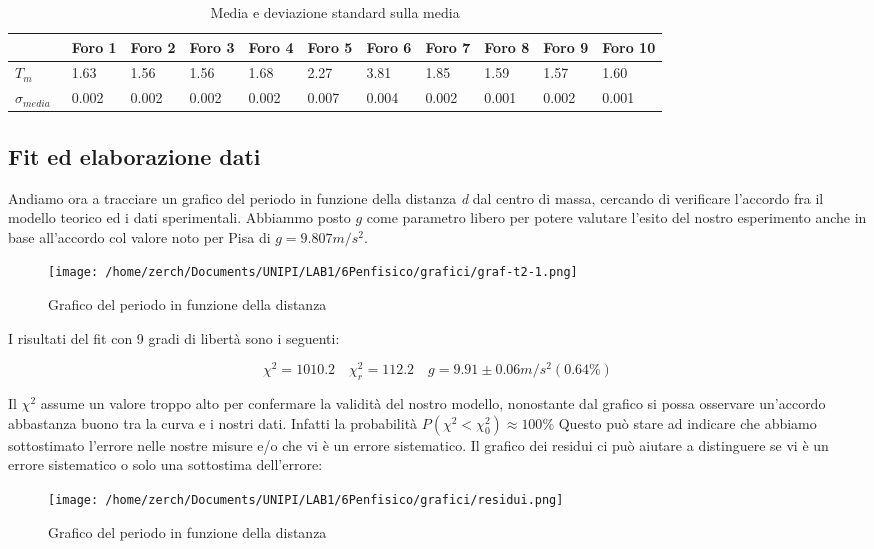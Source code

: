 \documentclass[a4paper,10pt]{article}
\begin{document}
\begin{table}[H]
\centering
\caption{Media e deviazione standard sulla media}
\label{my-label}
\begin{tabular}{|l|l|l|l|l|l|l|l|l|l|l|}
\hline
          & Foro 1 & Foro 2 & Foro 3 & Foro 4 & Foro 5 & Foro 6 & Foro 7 & Foro 8 & Foro 9 & Foro 10 \\ \hline
$T_m$\      & 1.63  & 1.56  & 1.56  & 1.68  & 2.27  & 3.81  & 1.85  & 1.59  & 1.57  & 1.60   \\ \hline
$\sigma_{media}$\ &  0.002 &0.002 &0.002& 0.002& 0.007& 0.004 &0.002& 0.001& 0.002& 0.001 \\ \hline \end{tabular}
\end{table}
\subsection{Fit ed elaborazione dati}
Andiamo ora a tracciare un grafico del periodo in funzione della distanza \textit{d} dal centro di massa, cercando di verificare
l'accordo fra il modello teorico ed i dati sperimentali. Abbiammo posto $g$ come parametro libero per potere valutare l'esito del nostro esperimento anche in base all'accordo col valore noto per Pisa di $g=9.807 m/s^2$.

\begin{figure}[H]
 \centering
 \caption{Grafico del periodo in funzione della distanza}
 \texttt{[image: /home/zerch/Documents/UNIPI/LAB1/6Penfisico/grafici/graf-t2-1.png]}
\end{figure}

I risultati del fit con 9 gradi di libertà sono i seguenti:

\begin{equation}
\chi^2=1010.2 \quad \chi^2_r=112.2 \quad g=9.91\pm0.06 m/s^2 (0.64\%)
\end{equation}

Il $\chi^2 $ assume un valore troppo alto per confermare la validità del nostro modello, nonostante dal grafico si possa osservare un'accordo abbastanza buono tra la curva e i nostri dati. Infatti la probabilità $P(\chi^2<\chi^2_0)\approx 100\%$ Questo può stare ad indicare che abbiamo sottostimato l'errore nelle nostre misure e/o che vi è un errore sistematico.
Il grafico dei residui ci può aiutare a distinguere se vi è un errore sistematico o solo una sottostima dell'errore:

\begin{figure}[H]
 \centering
 \caption{Grafico del periodo in funzione della distanza}
 \texttt{[image: /home/zerch/Documents/UNIPI/LAB1/6Penfisico/grafici/residui.png]}
\end{figure}
\end{document}
